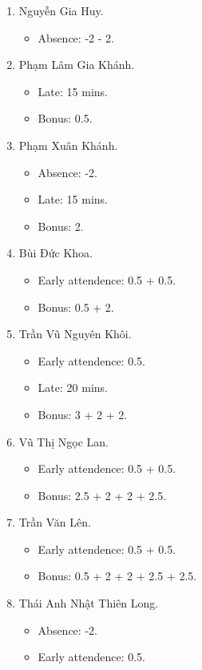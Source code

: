 \documentclass{article}
\begin{document}
\begin{enumerate}
\begin{itemize}
	\end{itemize}
	\item {\sc Nguyễn Gia Huy.}
	\begin{itemize}
		\item Absence: -2 - 2.
	\end{itemize}
	\item {\sc Phạm Lâm Gia Khánh.}
	\begin{itemize}
		\item Late: 15 mins.
		\item Bonus: 0.5.
	\end{itemize}
	\item {\sc Phạm Xuân Khánh.}
	\begin{itemize}
		\item Absence: -2.
		\item Late: 15 mins.
		\item Bonus: 2.
	\end{itemize}
	\item {\sc Bùi Đức Khoa.}
	\begin{itemize}
		\item Early attendence: 0.5 + 0.5.
		\item Bonus: 0.5 + 2.
	\end{itemize}
	\item {\sc Trần Vũ Nguyên Khôi.}
	\begin{itemize}
		\item Early attendence: 0.5.
		\item Late: 20 mins.
		\item Bonus: 3 + 2 + 2.
	\end{itemize}
	\item {\sc Vũ Thị Ngọc Lan.}
	\begin{itemize}
		\item Early attendence: 0.5 + 0.5.
		\item Bonus: 2.5 + 2 + 2 + 2.5.
	\end{itemize}
	\item {\sc Trần Văn Lên.}
	\begin{itemize}
		\item Early attendence: 0.5 + 0.5.
		\item Bonus: 0.5 + 2 + 2 + 2.5 + 2.5.
	\end{itemize}
	\item {\sc Thái Anh Nhật Thiên Long.}
	\begin{itemize}
		\item Absence: -2.
		\item Early attendence: 0.5.

\end{itemize}
\end{enumerate}
\end{document}

